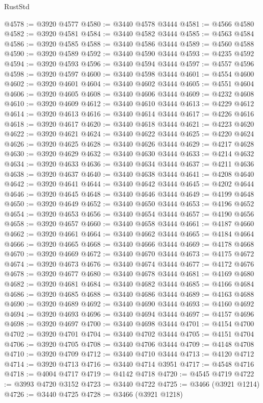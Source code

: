 \begin{lexlean}{RustStd}
\begin{coremodule}
@4578 := @3920 @4577
@4580 := @3440 @4578 @3444
@4581 := @4566 @4580
@4582 := @3920 @4581
@4584 := @3440 @4582 @3444
@4585 := @4563 @4584
@4586 := @3920 @4585
@4588 := @3440 @4586 @3444
@4589 := @4560 @4588
@4590 := @3920 @4589
@4592 := @3440 @4590 @3444
@4593 := @4235 @4592
@4594 := @3920 @4593
@4596 := @3440 @4594 @3444
@4597 := @4557 @4596
@4598 := @3920 @4597
@4600 := @3440 @4598 @3444
@4601 := @4554 @4600
@4602 := @3920 @4601
@4604 := @3440 @4602 @3444
@4605 := @4551 @4604
@4606 := @3920 @4605
@4608 := @3440 @4606 @3444
@4609 := @4232 @4608
@4610 := @3920 @4609
@4612 := @3440 @4610 @3444
@4613 := @4229 @4612
@4614 := @3920 @4613
@4616 := @3440 @4614 @3444
@4617 := @4226 @4616
@4618 := @3920 @4617
@4620 := @3440 @4618 @3444
@4621 := @4223 @4620
@4622 := @3920 @4621
@4624 := @3440 @4622 @3444
@4625 := @4220 @4624
@4626 := @3920 @4625
@4628 := @3440 @4626 @3444
@4629 := @4217 @4628
@4630 := @3920 @4629
@4632 := @3440 @4630 @3444
@4633 := @4214 @4632
@4634 := @3920 @4633
@4636 := @3440 @4634 @3444
@4637 := @4211 @4636
@4638 := @3920 @4637
@4640 := @3440 @4638 @3444
@4641 := @4208 @4640
@4642 := @3920 @4641
@4644 := @3440 @4642 @3444
@4645 := @4202 @4644
@4646 := @3920 @4645
@4648 := @3440 @4646 @3444
@4649 := @4199 @4648
@4650 := @3920 @4649
@4652 := @3440 @4650 @3444
@4653 := @4196 @4652
@4654 := @3920 @4653
@4656 := @3440 @4654 @3444
@4657 := @4190 @4656
@4658 := @3920 @4657
@4660 := @3440 @4658 @3444
@4661 := @4187 @4660
@4662 := @3920 @4661
@4664 := @3440 @4662 @3444
@4665 := @4184 @4664
@4666 := @3920 @4665
@4668 := @3440 @4666 @3444
@4669 := @4178 @4668
@4670 := @3920 @4669
@4672 := @3440 @4670 @3444
@4673 := @4175 @4672
@4674 := @3920 @4673
@4676 := @3440 @4674 @3444
@4677 := @4172 @4676
@4678 := @3920 @4677
@4680 := @3440 @4678 @3444
@4681 := @4169 @4680
@4682 := @3920 @4681
@4684 := @3440 @4682 @3444
@4685 := @4166 @4684
@4686 := @3920 @4685
@4688 := @3440 @4686 @3444
@4689 := @4163 @4688
@4690 := @3920 @4689
@4692 := @3440 @4690 @3444
@4693 := @4160 @4692
@4694 := @3920 @4693
@4696 := @3440 @4694 @3444
@4697 := @4157 @4696
@4698 := @3920 @4697
@4700 := @3440 @4698 @3444
@4701 := @4154 @4700
@4702 := @3920 @4701
@4704 := @3440 @4702 @3444
@4705 := @4151 @4704
@4706 := @3920 @4705
@4708 := @3440 @4706 @3444
@4709 := @4148 @4708
@4710 := @3920 @4709
@4712 := @3440 @4710 @3444
@4713 := @4120 @4712
@4714 := @3920 @4713
@4716 := @3440 @4714 @3951
@4717 := @4548 @4716
@4718 := @4004 @4717
@4719 := @4142 @4718
@4720 := @4545 @4719
@4722 := @3993 @4720 @3152
@4723 := @3440 @4722
@4725 := @3466 (@3921 @1214)
@4726 := @3440 @4725
@4728 := @3466 (@3921 @1218)

\end{coremodule}
\end{lexlean}
